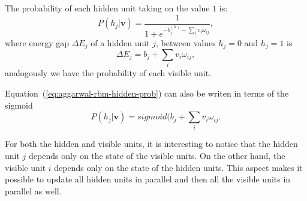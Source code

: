 The probability of each hidden unit taking on the value $1$ is:
\begin{equation}
    \label{eq:aggarwal-rbm-hidden-prob}
    P(h_{j} | \mathbf{v}) = \frac{1}{1 + e^{-b^{(h)}_{j} - \sum_{i} v_{i} \omega_{ij}}},
\end{equation}
where energy gap $\Delta E_{j}$ of a hidden unit $j$, between values $h_{j} = 0$ and $h_{j} = 1$ is
\begin{equation}
    \label{eq:aggarwal-rbm-energy-gap-hidden}
    \Delta E_{j} = b_{j} + \sum_{i} v_{i} \omega_{ij},
\end{equation}
analogously we have the probability of each visible unit.

Equation~(\ref{eq:aggarwal-rbm-hidden-prob}) can also be writen in terms of the sigmoid
\begin{equation}
    \label{eq:aggarwal-rbm-hidden-prob-sigmoid}
    P(h_{j} | \mathbf{v}) = sigmoid(b_{j} + \sum_{i} v_{i} \omega_{ij}.
\end{equation}

For both the hidden and visible units, it is interesting to notice that the hidden unit $j$ depends only on the state of the visible units.
On the other hand, the visible unit $i$ depends only on the state of the hidden units.
This aspect makes it possible to update all hidden units in parallel and then all the visible units in parallel as well.

